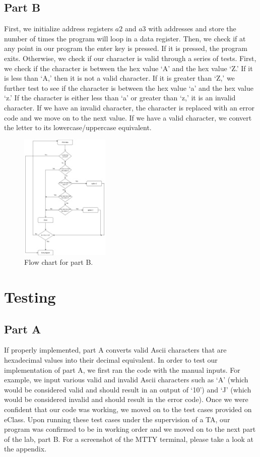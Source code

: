 \documentclass[10pt, letterpaper, titlepage]{article} %
\begin{document}
\begin{multicols*}{2}
\subsection{Part B}
First, we initialize address registers $a2$ and $a3$ with addresses and store the number of times the program will loop in a data register. 
Then, we check if at any point in our program the enter key is pressed. 
If it is pressed, the program exits. Otherwise, we check if our character is valid through a series of tests. 
First, we check if the character is between the hex value `A' and the hex value `Z.' 
If it is less than `A,' then it is not a valid character. 
If it is greater than `Z,' we further test to see if the character is between the hex value `a' and the hex value `z.' 
If the character is either less than `a' or greater than `z,' it is an invalid character. 
If we have an invalid character, the character is replaced with an error code and we move on to the next value. 
If we have a valid character, we convert the letter to its lowercase/uppercase equivalent.

\begin{figure}[H]
   \includegraphics[width=0.38\textwidth]{PartBDiagram.png}
   \centering  
   \caption{Flow chart for part B.} 
   \label{figure:2}
\end{figure}

\section{Testing}
\subsection{Part A}
If properly implemented, part A converts valid Ascii characters that are hexadecimal values into their decimal equivalent. 
In order to test our implementation of part A, we first ran the code with the manual inputs. 
For example, we input various valid and invalid Ascii characters such as `A' (which would be considered valid and should result in an output of `10') and `J' (which would be considered invalid and should result in the error code). 
Once we were confident that our code was working, we moved on to the test cases provided on eClass. 
Upon running these test cases under the supervision of a TA, our program was confirmed to be in working order and we moved on to the next part of the lab, part B.
For a screenshot of the MTTY terminal, please take a look at the appendix.


\end{multicols*}
\end{document}

